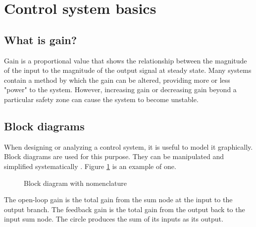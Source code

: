 \section{Control system basics}

\subsection{What is gain?}

Gain is a proportional value that shows the relationship between the magnitude
of the input to the magnitude of the output signal at steady state. Many
\glspl{system} contain a method by which the gain can be altered, providing more
or less "power" to the \gls{system}. However, increasing gain or decreasing gain
beyond a particular safety zone can cause the \gls{system} to become unstable.

\subsection{Block diagrams}

When designing or analyzing a control system, it is useful to model it
graphically. Block diagrams are used for this purpose. They can be manipulated
and simplified systematically \cite{bib:block_diagrams}. Figure
\ref{fig:gain_nomenclature} is an example of one.

\begin{figure}[H]
  \centering


  \caption{Block diagram with nomenclature}
  \label{fig:gain_nomenclature}
\end{figure}

The open-loop gain is the total gain from the sum node at the input to the
output branch. The feedback gain is the total gain from the output back to the
input sum node. The circle produces the sum of its inputs as its output. \\

